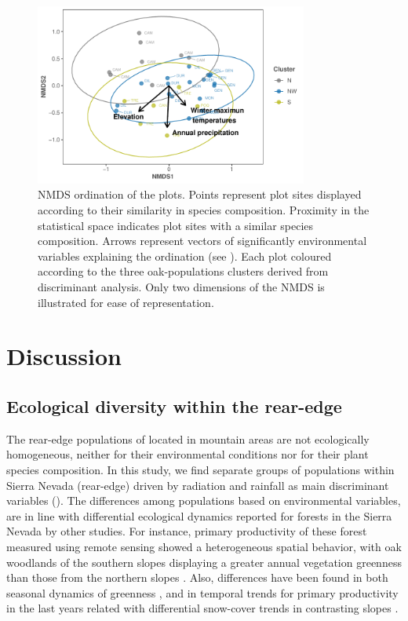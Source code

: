 \begin{figure}
\centering
\includegraphics[width=0.8\textwidth]{img/multivariante/nmds} 
\caption{NMDS ordination of the plots. Points represent plot sites displayed according to their similarity in species composition. Proximity in the statistical space indicates plot sites with a similar species composition. Arrows represent vectors of significantly environmental variables explaining the ordination (see ). Each plot coloured according to the three oak-populations clusters derived from discriminant analysis. Only two dimensions of the NMDS is illustrated for ease of representation.} 
\label{fig:multivar:nmds}
\end{figure}

\section{Discussion}\label{sec:multivar:Discussion}
\subsection{Ecological diversity within the rear-edge}\label{sec:multivar:EcolDiversity}

The rear-edge populations of \Qpy located in mountain areas are not ecologically homogeneous, neither for their environmental conditions nor for their plant species composition. In this study, we find separate groups of \Qp populations within Sierra Nevada (rear-edge) driven by radiation and rainfall as main discriminant variables (). The differences among populations based on environmental variables, are in line with differential ecological dynamics reported for \Qp forests in the Sierra Nevada by other studies. For instance, primary productivity of these forest measured using remote sensing showed a heterogeneous spatial behavior, with oak woodlands of the southern slopes displaying a greater annual vegetation greenness than those from the northern slopes \autocite{Dionisioetal2012SatelliteBasedMonitoring,PerezLuqueetal2015OntologicalSystem,PerezLuqueetal2020LanduseLegacies}. Also, differences have been found in both seasonal dynamics of greenness \autocite{Dionisioetal2012SatelliteBasedMonitoring}, and in temporal trends for primary productivity in the last years related with differential snow-cover trends in contrasting slopes \autocite{PerezLuqueetal2015OntologicalSystem,AlcarazSeguraetal2016ChangesVegetation}.

